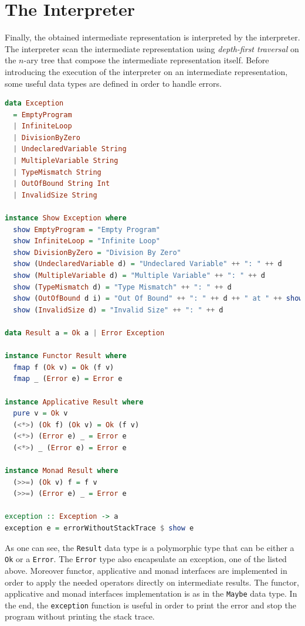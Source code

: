 \documentclass[12pt,a4paper]{article}
\begin{document}
\clearpage

\section*{The Interpreter}
Finally, the obtained intermediate representation is interpreted by the interpreter.
The interpreter scan the intermediate representation using \textit{depth-first traversal} on the $n$-ary tree that compose the intermediate representation itself.
Before introducing the execution of the interpreter on an intermediate representation, some useful data types are defined in order to handle errors.
\begin{lstlisting}[language=Haskell, style=custom-style]
data Exception
  = EmptyProgram
  | InfiniteLoop
  | DivisionByZero
  | UndeclaredVariable String
  | MultipleVariable String
  | TypeMismatch String
  | OutOfBound String Int
  | InvalidSize String

instance Show Exception where
  show EmptyProgram = "Empty Program"
  show InfiniteLoop = "Infinite Loop"
  show DivisionByZero = "Division By Zero"
  show (UndeclaredVariable d) = "Undeclared Variable" ++ ": " ++ d
  show (MultipleVariable d) = "Multiple Variable" ++ ": " ++ d
  show (TypeMismatch d) = "Type Mismatch" ++ ": " ++ d
  show (OutOfBound d i) = "Out Of Bound" ++ ": " ++ d ++ " at " ++ show i
  show (InvalidSize d) = "Invalid Size" ++ ": " ++ d

data Result a = Ok a | Error Exception

instance Functor Result where
  fmap f (Ok v) = Ok (f v)
  fmap _ (Error e) = Error e

instance Applicative Result where
  pure v = Ok v
  (<*>) (Ok f) (Ok v) = Ok (f v)
  (<*>) (Error e) _ = Error e
  (<*>) _ (Error e) = Error e

instance Monad Result where
  (>>=) (Ok v) f = f v
  (>>=) (Error e) _ = Error e

exception :: Exception -> a
exception e = errorWithoutStackTrace $ show e
\end{lstlisting}
As one can see, the \texttt{Result} data type is a polymorphic type that can be either a \texttt{Ok} or a \texttt{Error}.
The \texttt{Error} type also encapsulate an exception, one of the listed above.
Moreover functor, applicative and monad interfaces are implemented in order to apply the needed operators directly on intermediate results.
The functor, applicative and monad interfaces implementation is as in the \texttt{Maybe} data type.
In the end, the \texttt{exception} function is useful in order to print the error and stop the program without printing the stack trace.
\end{document}
